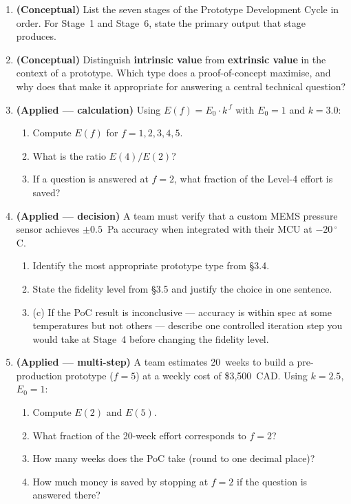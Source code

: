 \begin{enumerate}

  \item \textbf{(Conceptual)} List the seven stages of the Prototype Development
  Cycle in order. For Stage~1 and Stage~6, state the primary output that stage
  produces.

  \item \textbf{(Conceptual)} Distinguish \textbf{intrinsic value} from
  \textbf{extrinsic value} in the context of a prototype. Which type does a
  proof-of-concept maximise, and why does that make it appropriate for answering
  a central technical question?

  \item \textbf{(Applied --- calculation)} Using $E(f) = E_0 \cdot k^{\,f}$ with
  $E_0 = 1$ and $k = 3.0$:
  \begin{enumerate}
    \item Compute $E(f)$ for $f = 1, 2, 3, 4, 5$.
    \item What is the ratio $E(4)/E(2)$?
    \item If a question is answered at $f = 2$, what fraction of the Level-4
          effort is saved?
  \end{enumerate}

  \item \textbf{(Applied --- decision)} A team must verify that a custom MEMS
  pressure sensor achieves $\pm 0.5$~Pa accuracy when integrated with their
  MCU at $-20\,^{\circ}$C.
  \begin{enumerate}
    \item Identify the most appropriate prototype type from \S3.4.
    \item State the fidelity level from \S3.5 and justify the choice in one
          sentence.
    \item (c) If the PoC result is inconclusive --- accuracy is within spec at
          some temperatures but not others --- describe one controlled iteration
          step you would take at Stage~4 before changing the fidelity level.
  \end{enumerate}

  \item \textbf{(Applied --- multi-step)} A team estimates 20~weeks to build a
  pre-production prototype ($f = 5$) at a weekly cost of \$3{,}500~CAD.
  Using $k = 2.5$, $E_0 = 1$:
  \begin{enumerate}
    \item Compute $E(2)$ and $E(5)$.
    \item What fraction of the 20-week effort corresponds to $f = 2$?
    \item How many weeks does the PoC take (round to one decimal place)?
    \item How much money is saved by stopping at $f = 2$ if the question is
          answered there?
  \end{enumerate}

\end{enumerate}

